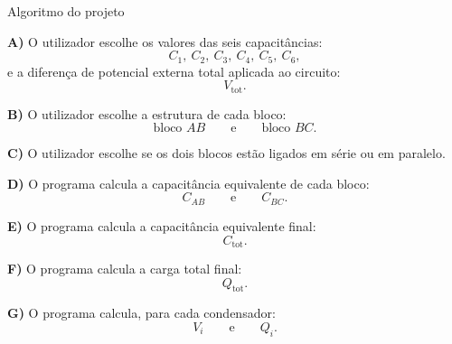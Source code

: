 \documentclass{beamer}
\begin{document}
\begin{frame}{Algoritmo do projeto}
	\scriptsize
	
	\textbf{A)} O utilizador escolhe os valores das seis capacitâncias:
	\[
	C_1,\ C_2,\ C_3,\ C_4,\ C_5,\ C_6,
	\]
	e a diferença de potencial externa total aplicada ao circuito:
	\[
	V_{\mathrm{tot}}.
	\]
	
	\textbf{B)} O utilizador escolhe a estrutura de cada bloco:
	\[
	\text{bloco } AB
	\qquad \text{e} \qquad
	\text{bloco } BC.
	\]
	
	\textbf{C)} O utilizador escolhe se os dois blocos estão ligados em série ou em paralelo.
	
	\textbf{D)} O programa calcula a capacitância equivalente de cada bloco:
	\[
	C_{AB}
	\qquad \text{e} \qquad
	C_{BC}.
	\]
	
	\textbf{E)} O programa calcula a capacitância equivalente final:
	\[
	C_{\mathrm{tot}}.
	\]
	
	\textbf{F)} O programa calcula a carga total final:
	\[
	Q_{\mathrm{tot}}.
	\]
	
	\textbf{G)} O programa calcula, para cada condensador:
	\[
	V_i
	\qquad \text{e} \qquad
	Q_i.
	\]
	
\end{frame}
	
\end{document}
